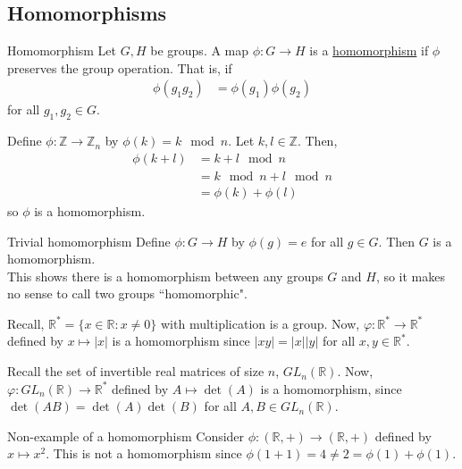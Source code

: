 \documentclass[12pt]{article}
\newcommand{\R}{\mathbb{R}}
\newcommand{\Z}{\mathbb{Z}}
\begin{document}
	\subsection{Homomorphisms}
	
	\begin{mydef}{Homomorphism}{}
		Let $G, H$ be groups. A map $\phi:G\to H$ is a \underline{homomorphism} if $\phi$ preserves the group operation. That is, if
		\begin{align*}
			\phi(g_1g_2)&=\phi(g_1)\phi(g_2)
		\end{align*}
		for all $g_1, g_2\in G$.
	\end{mydef}
	
	\begin{myex}{}{}
		Define $\phi:\Z\to\Z_n$ by $\phi(k)=k\mod n$. Let $k, l\in\Z$. Then,
		\begin{align*}
			\phi(k+l)&=k+l\mod n\\
			&=k\mod n+l\mod n\\
			&=\phi(k)+\phi(l)
		\end{align*}
		so $\phi$ is a homomorphism.
	\end{myex}
	
	\begin{myex}{Trivial homomorphism}{}
		Define $\phi:G\to H$ by $\phi(g)=e$ for all $g\in G$. Then $G$ is a homomorphism.\\
		
		This shows there is a homomorphism between any groups $G$ and $H$, so it makes no sense to call two groups ``homomorphic".
	\end{myex}
	
	\begin{myex}{}{}
		Recall, $\R^*=\{x\in\R:x\neq0\}$ with multiplication is a group. Now, $\varphi:\R^*\to\R^*$ defined by $x\mapsto|x|$ is a homomorphism since $|xy|=|x||y|$ for all $x, y\in\R^*$.
	\end{myex}
	
	\begin{myex}{}{}
		Recall the set of invertible real matrices of size $n$, $GL_n(\R)$. Now, $\varphi:GL_n(\R)\to\R^*$ defined by $A\mapsto\det(A)$ is a homomorphism, since $\det(AB)=\det(A)\det(B)$ for all $A, B\in GL_n(\R)$.
	\end{myex}
	
	\begin{myex}{Non-example of a homomorphism}{}
		Consider $\phi:(\R, +)\to(\R, +)$ defined by $x\mapsto x^2$. This is not a homomorphism since $\phi(1+1)=4\neq2=\phi(1)+\phi(1)$.
	\end{myex}
	
\end{document}
